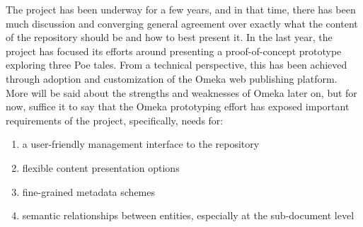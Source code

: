 \needswork The \apc project has been underway for a few years, and in that time, there has been much discussion and converging general agreement over exactly what the content of the repository should be and how to best present it. In the last year, the project has focused its efforts around presenting a proof-of-concept prototype exploring three Poe tales. From a technical perspective, this has been achieved through adoption and customization of the Omeka web publishing platform. More will be said about the strengths and weaknesses of Omeka later on, but for now, suffice it to say that the Omeka prototyping effort has exposed important requirements of the project, specifically, needs for:
\begin{enumerate}
  \item{a user-friendly management interface to the repository}
  \item{flexible content presentation options}
  \item{fine-grained metadata schemes}
  \item{semantic relationships between entities, especially at the sub-document level}
\end{enumerate}